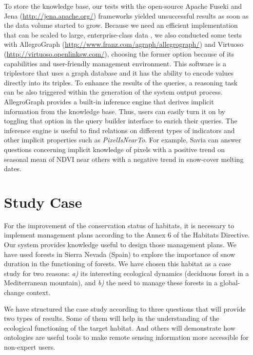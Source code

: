 To store the knowledge base, our tests with the open-source Apache Fuseki and Jena (\url{http://jena.apache.org/}) frameworks yielded unsuccessful results as soon as the data volume started to grow. Because we need an efficient implementation that can be scaled to large, enterprise-class data \autocite{Wilkinsonetal2004EfficientRDFa}, we also conducted some tests with AllegroGraph (\url{http://www.franz.com/agraph/allegrograph/}) and Virtuoso (\url{http://virtuoso.openlinksw.com/}), choosing the former option because of its capabilities and user-friendly management environment. This software is a triplestore that uses a graph database and it has the ability to encode values directly into its triples.
To enhance the results of the queries, a reasoning task can be also triggered within the generation of the system output process. AllegroGraph provides a built-in inference engine that derives implicit information from the knowledge base. Thus, users can easily turn it on by toggling that option in the query builder interface to enrich their queries. The inference engine is useful to find relations on different types of indicators and other implicit properties such as \emph{PixelIsNearTo}. For example, Savia can answer questions concerning implicit knowledge of pixels with a positive trend on seasonal mean of NDVI near others with a negative trend in snow-cover melting dates.

\section{Study Case}\label{sec:onto:CaseStudy}

For the improvement of the conservation status of habitats, it is necessary to implement management plans according to the Annex 6 of the Habitats Directive. Our system provides knowledge useful to design those management plans. We have used \Qp forests in Sierra Nevada (Spain) to explore the importance of snow duration in the functioning of \Qp forests. We have chosen this habitat as a case study for two reasons: \emph{a)} its interesting ecological dynamics (deciduous forest in a Mediterranean mountain), and \emph{b)} the need to manage these forests in a global-change context.

We have structured the case study according to three questions that will provide two types of results. Some of them will help in the understanding of the ecological functioning of the target habitat. And others will demonstrate how ontologies are useful tools to make remote sensing information more accessible for non-expert users.

